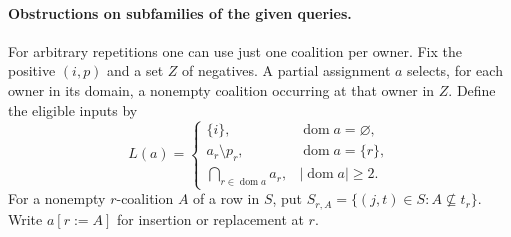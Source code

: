 \paragraph{Obstructions on subfamilies of the given queries.}
For arbitrary repetitions one can use just one coalition per owner.
Fix the positive $(i,p)$ and a set $Z$ of negatives. A partial assignment $a$ selects,
for each owner in its domain, a nonempty coalition occurring at that
owner in $Z$. Define the eligible inputs by
\[
 L(a)=
 \begin{cases}
 \{i\},&\operatorname{dom}a=\varnothing,\\
 a_r\setminus p_r,&\operatorname{dom}a=\{r\},\\
 \displaystyle\bigcap_{r\in\operatorname{dom}a}a_r,
      &|\operatorname{dom}a|\ge2 .
 \end{cases}
\]
For a nonempty $r$-coalition $A$ of a row in $S$, put
$S_{r,A}=\{(j,t)\in S:A\not\subseteq t_r\}$. Write $a[r:=A]$
for insertion or replacement at $r$.

